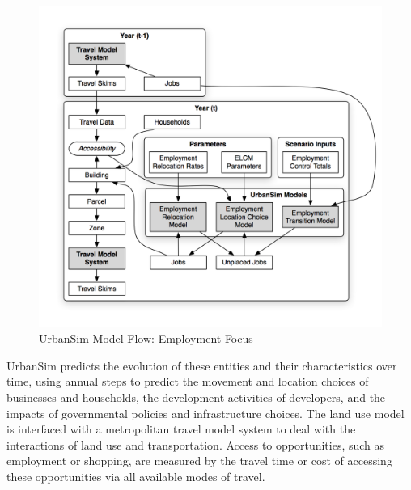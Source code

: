 \begin{figure}[h]
\center
 \includegraphics[width=5in]{graphics/ParcelEmploymentModel.png}
\caption{UrbanSim Model Flow: Employment Focus}
\label{fig:employment-models}
\end{figure}

UrbanSim predicts the evolution of these entities and their characteristics over time, using annual steps to predict the movement and location choices of businesses and households, the development activities of developers, and the impacts of governmental policies and infrastructure choices.  The land use model is interfaced with a metropolitan travel model system to deal with the interactions of land use and transportation. Access to opportunities, such as employment or shopping, are measured by the travel time or cost of accessing these opportunities via all available modes of travel.


